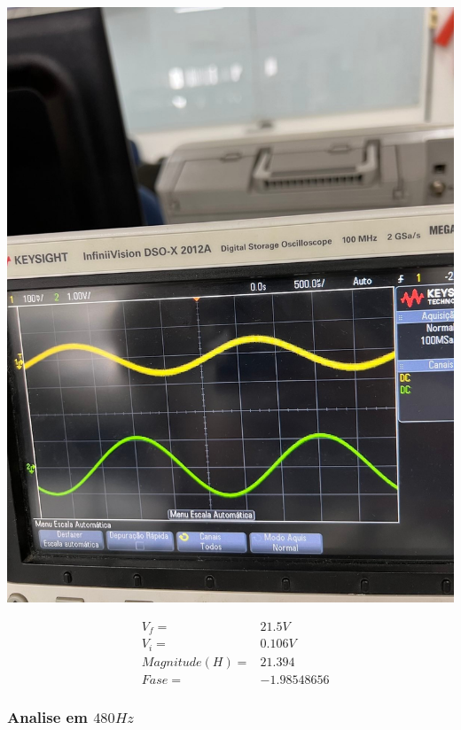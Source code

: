 \documentclass[12pt,twoside, a4paper, twocolumn]{article}
\begin{document}
\begin{adjustbox}{scale=0.18}
    \includegraphics{freq400.jpeg}
\end{adjustbox}


\begin{equation*}
    \begin{aligned}
         & V_f =          & 21.5V       \\
         & V_i =          & 0.106V      \\
         & Magnitude(H) = & 21.394      \\
         & Fase =         & -1.98548656
    \end{aligned}
\end{equation*}


\subsubsection{Analise em $480Hz$}
\subparagraph*{}
\end{document}
